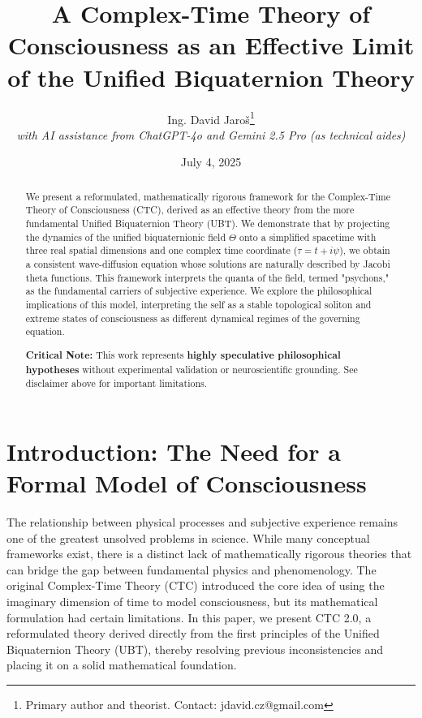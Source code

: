\documentclass[12pt, a4paper]{article}
\title{\textbf{A Complex-Time Theory of Consciousness as an Effective Limit of the Unified Biquaternion Theory}}
\author{Ing. David Jaroš\thanks{Primary author and theorist. Contact: jdavid.cz@gmail.com} \\
\textit{with AI assistance from ChatGPT-4o and Gemini 2.5 Pro (as technical aides)}}
\date{July 4, 2025}
\begin{document}
\maketitle


\ConsciousnessDisclaimer

\begin{abstract}
We present a reformulated, mathematically rigorous framework for the Complex-Time Theory of Consciousness (CTC), derived as an effective theory from the more fundamental Unified Biquaternion Theory (UBT). We demonstrate that by projecting the dynamics of the unified biquaternionic field \( \Theta \) onto a simplified spacetime with three real spatial dimensions and one complex time coordinate (\( \tau = t + i\psi \)), we obtain a consistent wave-diffusion equation whose solutions are naturally described by Jacobi theta functions. This framework interprets the quanta of the field, termed "psychons," as the fundamental carriers of subjective experience. We explore the philosophical implications of this model, interpreting the self as a stable topological soliton and extreme states of consciousness as different dynamical regimes of the governing equation.

\textbf{Critical Note:} This work represents \textbf{highly speculative philosophical hypotheses} without experimental validation or neuroscientific grounding. See disclaimer above for important limitations.
\end{abstract}

\section{Introduction: The Need for a Formal Model of Consciousness}
The relationship between physical processes and subjective experience remains one of the greatest unsolved problems in science. While many conceptual frameworks exist, there is a distinct lack of mathematically rigorous theories that can bridge the gap between fundamental physics and phenomenology. The original Complex-Time Theory (CTC) introduced the core idea of using the imaginary dimension of time to model consciousness, but its mathematical formulation had certain limitations. In this paper, we present CTC 2.0, a reformulated theory derived directly from the first principles of the Unified Biquaternion Theory (UBT), thereby resolving previous inconsistencies and placing it on a solid mathematical foundation.
\end{document}
